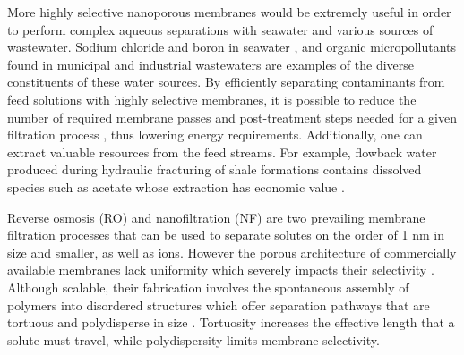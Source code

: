 \documentclass[journal=jpcbfk,manuscript=article]{achemso}
\begin{document}

  More highly selective nanoporous membranes would be extremely useful in order
  to perform complex aqueous separations with seawater and various sources of
  wastewater. Sodium chloride and boron in seawater
  \cite{fritzmann_state---art_2007}, and organic micropollutants found in
  municipal and industrial wastewaters \cite{schwarzenbach_challenge_2006} are
  examples of the diverse constituents of these water sources. By efficiently
  separating contaminants from feed solutions with highly selective membranes,
  it is possible to reduce the number of required membrane passes and post-treatment steps
  needed for a given filtration process \cite{werber_materials_2016}, thus
  lowering energy requirements. Additionally, one can extract valuable resources
  from the feed streams. For example, flowback water produced during hydraulic
  fracturing of shale formations contains dissolved species such as acetate whose
  extraction has economic value \cite{dischinger_application_2017}.  



  Reverse osmosis (RO) and nanofiltration (NF) are two prevailing membrane
  filtration processes that can be used to separate solutes on the order of 1 nm
  in size and smaller, as well as ions. However the porous architecture of
  commercially available membranes lack uniformity which severely impacts their
  selectivity \cite{van_der_bruggen_review_2003}. Although scalable, their
  fabrication involves the spontaneous assembly of polymers into disordered
  structures which offer separation pathways that are tortuous and polydisperse
  in size \cite{werber_materials_2016}. Tortuosity increases the effective
  length that a solute must travel, while polydispersity limits membrane
  selectivity.
\end{document}
